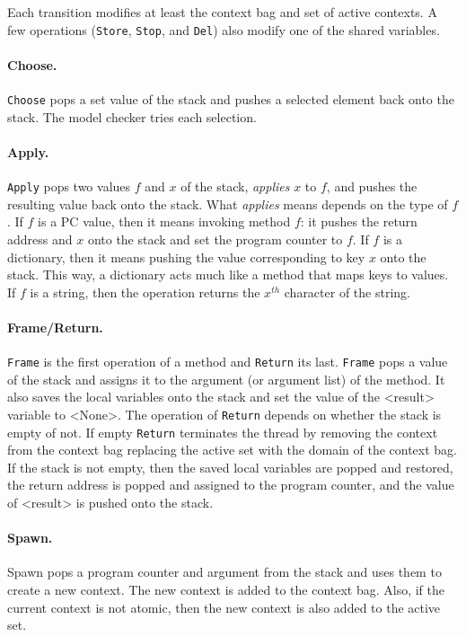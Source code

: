 \documentclass[twocolumn]{article}
\begin{document}
Each transition modifies at least the context bag and set of active
contexts.
A few operations (\texttt{Store}, \texttt{Stop}, and \texttt{Del})
also modify one of the shared variables.

\paragraph{Choose.} \texttt{Choose} pops a set value of the stack
and pushes a selected element back onto the stack.  The model checker
tries each selection.

\paragraph{Apply.}  \texttt{Apply} pops two values $f$ and $x$ of the stack,
\emph{applies} $x$ to $f$, and pushes the resulting value back onto the
stack.  What \emph{applies} means depends on the type of $f$.  If $f$ is
a PC value, then it means invoking method $f$: it pushes the return address
and $x$ onto the stack and set the program counter to $f$.  If $f$ is a
dictionary, then it means pushing the value corresponding to key $x$ onto
the stack.  This way, a dictionary acts much like a method that maps keys
to values.  If $f$ is a string, then the operation returns the $x^{th}$
character of the string.

\paragraph{Frame/Return.}  \texttt{Frame} is the first operation of
a method and \texttt{Return} its last.  \texttt{Frame} pops a value of
the stack and assigns it to the argument (or argument list) of the
method.  It also saves the local variables onto the stack and set the
value of the <{result}> variable to <{None}>.  The operation of
\texttt{Return} depends on whether the stack is empty of not.  If empty
\texttt{Return} terminates the thread by removing the context from the
context bag replacing the active set with the domain of the context bag.
If the stack is not empty, then the saved local variables are popped
and restored, the return address is popped and assigned to the
program counter, and the value of <{result}> is pushed onto the
stack.

\paragraph{Spawn.}  Spawn pops a program counter and argument from the
stack and uses them to create a new context.  The new context is added
to the context bag.  Also, if the current context is not atomic, then
the new context is also added to the active set.
\end{document}
